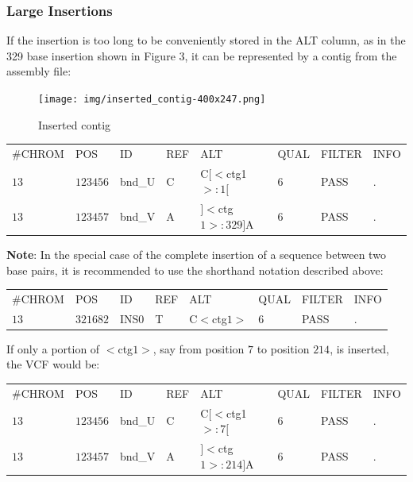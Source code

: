 \documentclass[8pt]{article}
\begin{document}
\subsubsection{Large Insertions}
If the insertion is too long to be conveniently stored in the ALT column, as in the 329 base insertion shown in Figure 3, it can be represented by a contig from the assembly file:

\begin{figure}[h]
\centering
\texttt{[image: img/inserted\_contig-400x247.png]}
\caption{Inserted contig}
\end{figure}

\vspace{0.3cm}
\small
\begin{tabular}{ l l l l l l l l }
\#CHROM & POS & ID & REF & ALT & QUAL & FILTER & INFO \\
$13$ & $123456$ & bnd\_U & C & C$[<$ctg1$>:1[$ & $6$ & PASS & . \\
$13$ & $123457$ & bnd\_V & A & $]<$ctg$1>:329]$A & $6$ & PASS & . \\
\end{tabular}
\normalsize
\vspace{0.3cm}

\textbf{Note}: In the special case of the complete insertion of a sequence between two base pairs, it is recommended to use the shorthand notation described above:

\vspace{0.3cm}
\begin{tabular}{ l l l l l l l l }
\#CHROM & POS & ID & REF & ALT & QUAL & FILTER & INFO \\
$13$ & $321682$ & INS0 & T & C$<$ctg$1>$ & $6$ & PASS & . \\
\end{tabular}
\vspace{0.3cm}

If only a portion of $<$ctg$1>$, say from position $7$ to position $214$, is inserted, the VCF would be:
\par\nobreak
\vspace{0.3cm}
\small
\begin{tabular}{ l l l l l l l l }
\#CHROM & POS & ID & REF & ALT & QUAL & FILTER & INFO \\
$13$ & $123456$ & bnd\_U & C & C$[<$ctg1$>:7[$ & $6$ & PASS & . \\
$13$ & $123457$ & bnd\_V & A & $]<$ctg$1>:214]$A & $6$ & PASS & . \\
\end{tabular}
\normalsize
\vspace{0.3cm}
\end{document}
